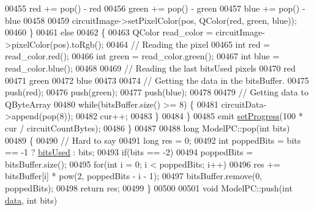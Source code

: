\begin{DoxyCode}
00455         red += pop() - red %
00456         green += pop() - green %
00457         blue += pop() - blue %
00458 
00459         circuitImage->setPixelColor(pos, QColor(red, green, blue));
00460     \}
00461     \textcolor{keywordflow}{else}
00462     \{
00463         QColor read\_color = circuitImage->pixelColor(pos).toRgb();
00464         \textcolor{comment}{// Reading the pixel}
00465         \textcolor{keywordtype}{int} red = read\_color.red();
00466         \textcolor{keywordtype}{int} green = read\_color.green();
00467         \textcolor{keywordtype}{int} blue = read\_color.blue();
00468 
00469         \textcolor{comment}{// Reading the last bitsUsed pixels}
00470         red %
00471         green %
00472         blue %
00473 
00474         \textcolor{comment}{// Getting the data in the bitsBuffer.}
00475         push(red);
00476         push(green);
00477         push(blue);
00478 
00479         \textcolor{comment}{// Getting data to QByteArray}
00480         \textcolor{keywordflow}{while}(bitsBuffer.size() >= 8) \{
00481             circuitData->append(pop(8));
00482             cur++;
00483         \}
00484     \}
00485     emit \mbox{\hyperlink{class_model_p_c_a25a4496e129e87ac96f12257a123b84f}{setProgress}}(100 * cur / circuitCountBytes);
00486 \}
00487 
00488 \textcolor{keywordtype}{long} ModelPC::pop(\textcolor{keywordtype}{int} bits)
00489 \{
00490     \textcolor{comment}{// Hard to say}
00491     \textcolor{keywordtype}{long} res = 0;
00492     \textcolor{keywordtype}{int} poppedBits = bits == -1 ? \mbox{\hyperlink{class_model_p_c_a655deb6a8afa94c7f4aadb3056989038}{bitsUsed}} : bits;
00493     \textcolor{keywordflow}{if}(bits == -2)
00494         poppedBits = bitsBuffer.size();
00495     \textcolor{keywordflow}{for}(\textcolor{keywordtype}{int} i = 0; i < poppedBits; i++)
00496         res += bitsBuffer[i] * pow(2, poppedBits - i - 1);
00497     bitsBuffer.remove(0, poppedBits);
00498     \textcolor{keywordflow}{return} res;
00499 \}
00500 
00501 \textcolor{keywordtype}{void} ModelPC::push(\textcolor{keywordtype}{int} \mbox{\hyperlink{namespace_errors_dict_setup_af570460846fb9f0c91abd308a095dcdc}{data}}, \textcolor{keywordtype}{int} bits)

\end{DoxyCode}
